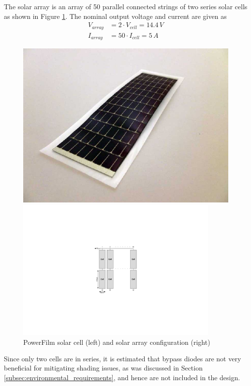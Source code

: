\noindent
The solar array is an array of 50 parallel connected strings of two series solar cells as shown in Figure \ref{fig:solar_cell}. The nominal output voltage and current are given as
%
\begin{equation}
\begin{split}
V_{array}&=2\cdot V_{cell}=14.4\,V\\
I_{array}&=50\cdot I_{cell}=5\,A
\end{split}
\end{equation}
%
\begin{figure}[H]
\centering
\begin{minipage}[t]{0.4\linewidth}
\centering
\includegraphics[width=\textwidth]{figures/SolarCell_RC7-2_Powerfilm}
\end{minipage}
\hspace{5mm}
\begin{minipage}[t]{0.55\linewidth}
\centering
\includegraphics[width=0.9\textwidth]{figures/fig_CDR_Solar_Array}
\end{minipage}
\caption{PowerFilm solar cell (left) and solar array configuration (right)}
\label{fig:solar_cell}
\end{figure}
%
\noindent
Since only two cells are in series, it is estimated that bypass diodes are not very beneficial for mitigating shading issues, as was discussed in Section \ref{subsec:environmental_requirements}, and hence are not included in the design.
%
